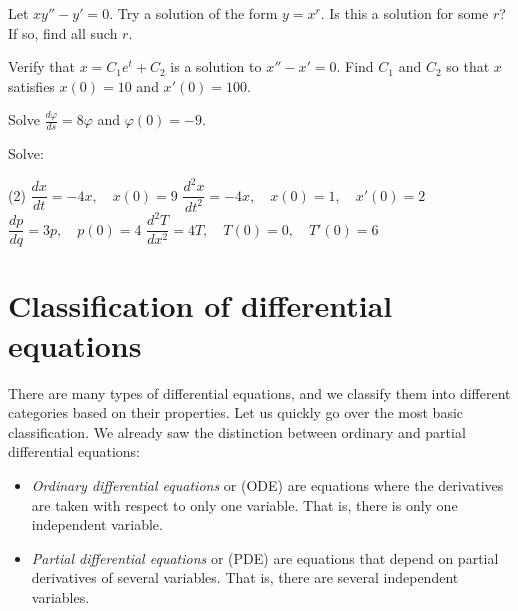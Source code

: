 \begin{exercise}
Let $xy'' - y' = 0$.  Try a solution of the form $y = x^r$.  Is this a
solution for some $r$?  If so, find all such $r$.
\end{exercise}


\begin{exercise}
Verify that $x=C_1e^t+C_2$ is a solution to $x''-x' = 0$.  Find $C_1$ and
$C_2$ so that $x$ satisfies $x(0) = 10$ and $x'(0) = 100$.
\end{exercise}

\begin{exercise}
Solve $\frac{d\varphi}{ds} = 8 \varphi$ and $\varphi(0) = -9$.
\end{exercise}

\begin{exercise}
Solve:
\begin{tasks}(2)
\task $\dfrac{dx}{dt} = -4x, \quad x(0)=9$
\task $\dfrac{d^2x}{dt^2} = -4x, \quad x(0)=1, \quad x'(0)=2$
\task $\dfrac{dp}{dq} = 3 p, \quad p(0)=4$
\task $\dfrac{d^2T}{dx^2} = 4 T, \quad T(0)=0, \quad T'(0)=6$
\end{tasks}
\end{exercise}


\sectionnewpage
\section{Classification of differential equations}
\label{classification:section}


There are many types of differential equations, and we classify them into
different categories based on their properties.  Let us quickly go over
the most basic classification.  We already saw the distinction
between ordinary and partial differential equations:
\begin{itemize}
\item
\emph{Ordinary differential equations}
 or (ODE) are
equations where the derivatives are taken with respect to only one variable.
That is, there is only one independent variable.
\item
\emph{Partial differential equations}
 or (PDE) are
equations that depend on partial derivatives of several variables.
That is, there are several independent variables.
\end{itemize}

